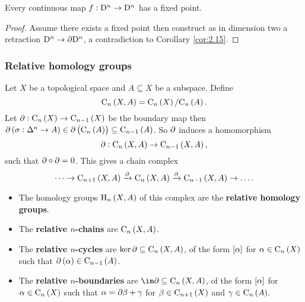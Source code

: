 \begin{theorem}
Every continuous map $ f : \mathrm{D}^n \to \mathrm{D}^n $ has a fixed point.
\end{theorem}

\begin{proof}
Assume there exists a fixed point then construct as in dimension two a retraction $ \mathrm{D}^n \to \partial \mathrm{D}^n $, a contradiction to Corollary \ref{cor:2.15}.
\end{proof}

\subsubsection{Relative homology groups}

Let $ X $ be a topological space and $ A \subseteq X $ be a subspace. Define
$$ \C_n\br{X, A} = \C_n\br{X} / \C_n\br{A}. $$
Let $ \da : \C_n\br{X} \to \C_{n - 1}\br{X} $ be the boundary map then $ \da\br{\sigma : \Delta^n \to A} \in \da\br{\C_n\br{A}} \subseteq \C_{n - 1}\br{A} $. So $ \partial $ induces a homomorphism
$$ \da : \C_n\br{X, A} \to \C_{n - 1}\br{X, A}, $$
such that $ \partial \circ \partial = 0 $. This gives a chain complex
$$ \dots \to \C_{n + 1}\br{X, A} \xrightarrow{\da} \C_n\br{X, A} \xrightarrow{\da} \C_{n - 1}\br{X, A} \to \dots. $$
\begin{itemize}
\item The homology groups $ \H_n\br{X, A} $ of this complex are the \textbf{relative homology groups}.
\item The \textbf{relative $ n $-chains} are $ \C_n\br{X, A} $.
\item The \textbf{relative $ n $-cycles} are $ \ker \da \subseteq \C_n\br{X, A} $, of the form $ \sbr{\alpha} $ for $ \alpha \in \C_n\br{X} $ such that $ \da\br{\alpha} \in \C_{n - 1}\br{A} $.
\item The \textbf{relative $ n $-boundaries} are $ \im \da \subseteq \C_n\br{X, A} $, of the form $ \sbr{\alpha} $ for $ \alpha \in \C_n\br{X} $ such that $ \alpha = \partial\beta + \gamma $ for $ \beta \in \C_{n + 1}\br{X} $ and $ \gamma \in \C_n\br{A} $.
\end{itemize}

\pagebreak


